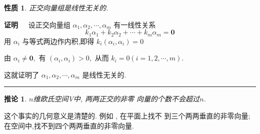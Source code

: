\documentclass[13pt]{beamer}
\newtheorem*{coro}{推论}
\newtheorem*{prop}{性质}
\def\qed{\nopagebreak\hfill{\rule{4pt}{7pt}}\medbreak}
\def\pf{{\bf 证明~~ }}
\begin{document}
\begin{frame}
\begin{prop}
	正交向量组是线性无关的.  
\end{prop}
\pf 设正交向量组 ${\alpha}_{1}, {\alpha}_{2}, \cdots, {\alpha}_{m}$ 有一线性关系
\[
k_{1} {\alpha}_{1}+k_{2} {\alpha}_{2}+\cdots+k_{m} {\alpha}_{m}=\mathbf{0}
\]
用 ${\alpha}_{i}$ 与等式两边作内积,即得
$k_{i}\left({\alpha}_{i}, {\alpha}_{i}\right)=0$

由 ${\alpha}_{i} \neq \mathbf{0},$ 有 $\left({\alpha}_{i}, {\alpha}_{i}\right)>0,$ 从而 $k_{i}=0(i=1,2, \cdots, m) .$ 

这就证明了
${\alpha}_{1}, {\alpha}_{2}, \cdots, {\alpha}_{m}$ 是线性无关的.
\qed
\begin{coro}
	$n$维欧氏空间V中, 两两正交的非零 向量的个数不会超过$n$. 
\end{coro}

这个事实的几何意义是清楚的.
例如 , 在平面上找不 到三个两两垂直的非零向量; 在空间中,找不到四个两两垂直的非零向量.

\end{frame}
\end{document}
